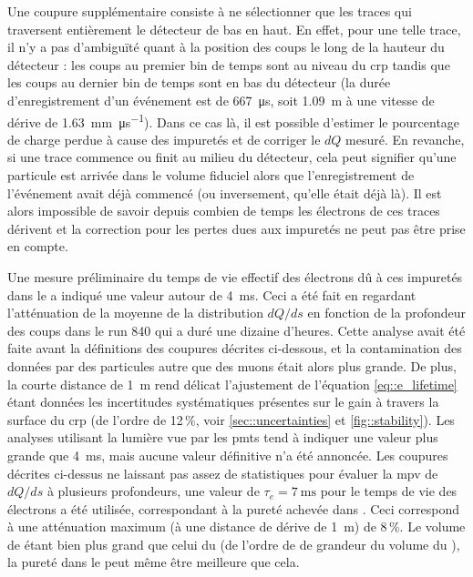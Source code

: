         Une coupure supplémentaire consiste à ne sélectionner que les traces qui traversent entièrement le détecteur de bas en haut. En effet, pour une telle trace, il n'y a pas d'ambiguïté quant à la position des coups le long de la hauteur du détecteur : les coups au premier bin de temps sont au niveau du \gls{crp} tandis que les coups au dernier bin de temps sont en bas du détecteur (la durée d'enregistrement d'un événement est de \SI{667}{\micro\second}, soit \SI{1.09}{\meter} à une vitesse de dérive de \SI{1.63}{\milli\meter\per\micro\second}). Dans ce cas là, il est possible d'estimer le pourcentage de charge perdue à cause des impuretés et de corriger le $dQ$ mesuré. En revanche, si une trace commence ou finit au milieu du détecteur, cela peut signifier qu'une particule est arrivée dans le volume fiduciel alors que l'enregistrement de l'événement avait déjà commencé (ou inversement, qu'elle était déjà là). Il est alors impossible de savoir depuis combien de temps les électrons de ces traces dérivent et la correction pour les pertes dues aux impuretés ne peut pas être prise en compte.

        Une mesure préliminaire du temps de vie effectif des électrons dû à ces impuretés dans le \TOO{} a indiqué une valeur autour de \SI{4}{\milli\second}\cite{Aimard2018}. Ceci a été fait en regardant l'atténuation de la moyenne de la distribution $dQ/ds$ en fonction de la profondeur des coups dans le run 840 qui a duré une dizaine d'heures. Cette analyse avait été faite avant la définitions des coupures décrites ci-dessous, et la contamination des données par des particules autre que des muons était alors plus grande. De plus, la courte distance de \SI{1}{\meter} rend délicat l'ajustement de l'équation \eqref{eq::e_lifetime} étant données les incertitudes systématiques présentes sur le gain à travers la surface du \gls{crp} (de l'ordre de 12\,\%, voir \autoref{sec::uncertainties} et \autoref{fig::stability}). Les analyses utilisant la lumière vue par les \glspl{pmt} tend à indiquer une valeur plus grande que \SI{4}{\milli\second}, mais aucune valeur définitive n'a été annoncée. Les coupures décrites ci-dessus ne laissant pas assez de statistiques pour évaluer la \gls{mpv} de $dQ/ds$ à plusieurs profondeurs, une valeur de $\tau_e = \SI{7}{\milli\second}$ pour le temps de vie des électrons a été utilisée, correspondant à la pureté achevée dans \protosp{}. Ceci correspond à une atténuation maximum (à une distance de dérive de \SI{1}{\meter}) de 8\,\%. Le volume de \protosp{} étant bien plus grand que celui du \TOO{} (de l'ordre de de grandeur du volume du \SSS{}), la pureté dans le \TOO{} peut même être meilleure que cela.
        
